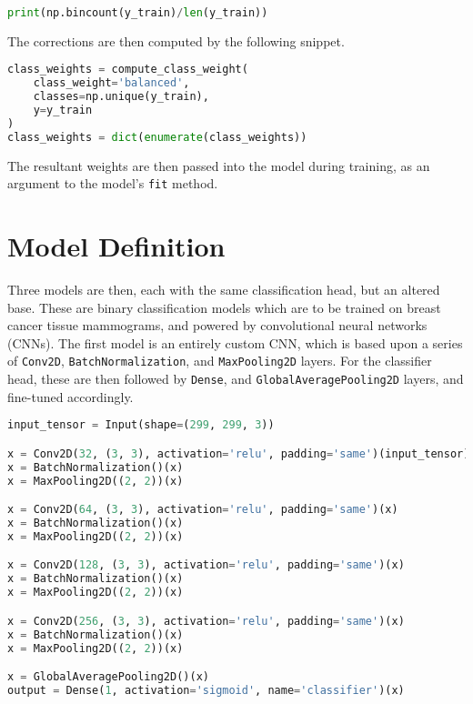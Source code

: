 \documentclass[../main]{subfiles}
\begin{document}
\begin{lstlisting}[language=Python, caption={A measure of class imbalance.}]
print(np.bincount(y_train)/len(y_train))
\end{lstlisting}

\noindent The corrections are then computed by the following snippet.

\begin{lstlisting}[language=Python, caption={Correcting the class imbalance.}]
class_weights = compute_class_weight(
    class_weight='balanced',
    classes=np.unique(y_train),
    y=y_train
)
class_weights = dict(enumerate(class_weights))
\end{lstlisting}

\noindent The resultant weights are then passed into the model during training,
as an argument to the model's \texttt{fit} method.

\section{Model Definition} Three models are then, each with the same
classification head, but an altered base. These are binary classification models
which are to be trained on breast cancer tissue mammograms, and powered by
convolutional neural networks (CNNs). The first model is an entirely custom CNN,
which is based upon a series of \texttt{Conv2D}, \texttt{BatchNormalization}, and
\texttt{MaxPooling2D} layers. For the classifier head, these are then followed by
\texttt{Dense}, and \texttt{GlobalAveragePooling2D} layers, and fine-tuned
accordingly.

\begin{lstlisting}[language=Python, caption={Custom CNN definition.}]
input_tensor = Input(shape=(299, 299, 3))

x = Conv2D(32, (3, 3), activation='relu', padding='same')(input_tensor)
x = BatchNormalization()(x)
x = MaxPooling2D((2, 2))(x)

x = Conv2D(64, (3, 3), activation='relu', padding='same')(x)
x = BatchNormalization()(x)
x = MaxPooling2D((2, 2))(x)

x = Conv2D(128, (3, 3), activation='relu', padding='same')(x)
x = BatchNormalization()(x)
x = MaxPooling2D((2, 2))(x)

x = Conv2D(256, (3, 3), activation='relu', padding='same')(x)
x = BatchNormalization()(x)
x = MaxPooling2D((2, 2))(x)

x = GlobalAveragePooling2D()(x)
output = Dense(1, activation='sigmoid', name='classifier')(x)
\end{lstlisting}
\end{document}
